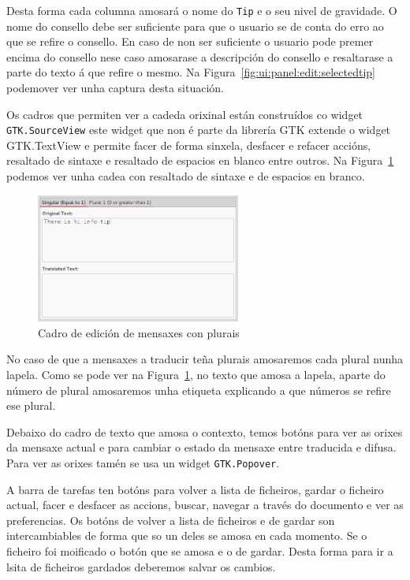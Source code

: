 Desta forma cada columna amosará o nome do \lstinline{Tip} e o seu nivel de gravidade. O nome do consello debe ser suficiente para que o usuario se de conta do erro ao que se refire o consello. En caso de non ser suficiente o usuario pode premer encima do consello nese caso amosarase a descripción do consello e resaltarase a parte do texto á que refire o mesmo. Na Figura~\ref{fig:ui:panel:edit:selectedtip} podemover ver unha captura desta situación.

Os cadros que permiten ver a cadeda orixinal están construídos co widget \lstinline{GTK.SourceView} este widget que non é parte da librería GTK extende o widget GTK.TextView e permite facer de forma sinxela, desfacer e refacer accións, resaltado de sintaxe e resaltado de espacios en blanco entre outros. Na Figura~\ref{fig:ui:panel:edit:pluralbox} podemos ver unha cadea con resaltado de sintaxe e de espacios en branco.

\begin{figure}[h!]
    \centering
    \includegraphics[width=0.6\textwidth]{img/editbox.png}
    \caption{Cadro de edición de mensaxes con plurais}
    \label{fig:ui:panel:edit:pluralbox}
\end{figure}

No caso de que a mensaxes a traducir teña plurais amosaremos cada plural nunha lapela. Como se pode ver na Figura~\ref{fig:ui:panel:edit:pluralbox}, no texto que amosa a lapela, aparte do número de plural amosaremos unha etiqueta explicando a que números se refire ese plural.

Debaixo do cadro de texto que amosa o contexto, temos botóns para ver as orixes da mensaxe actual e para cambiar o estado da mensaxe entre traducida e difusa. Para ver as orixes tamén se usa un widget \lstinline{GTK.Popover}.

A barra de tarefas ten botóns para volver a lista de ficheiros, gardar o ficheiro actual, facer e desfacer as accions, buscar, navegar a través do documento e ver as preferencias. Os botóns de volver a lista de ficheiros e de gardar son intercambiables de forma que so un deles se amosa en cada momento. Se o ficheiro foi moificado o botón que se amosa e o de gardar. Desta forma para ir a lsita de ficheiros gardados deberemos salvar os cambios.



